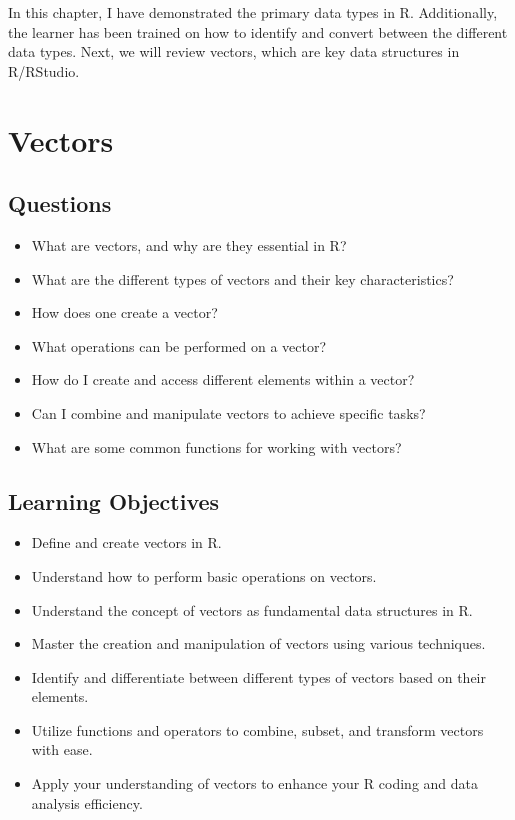 \documentclass[
  letterpaper,
  DIV=11,
  numbers=noendperiod]{scrreprt}
\begin{document}
In this chapter, I have demonstrated the primary data types in R.
Additionally, the learner has been trained on how to identify and
convert between the different data types. Next, we will review vectors,
which are key data structures in R/RStudio.


\chapter{Vectors}\label{sec-vectors}

\section{Questions}\label{questions-8}

\begin{itemize}
\item
  What are vectors, and why are they essential in R?
\item
  What are the different types of vectors and their key characteristics?
\item
  How does one create a vector?
\item
  What operations can be performed on a vector?
\item
  How do I create and access different elements within a vector?
\item
  Can I combine and manipulate vectors to achieve specific tasks?
\item
  What are some common functions for working with vectors?
\end{itemize}

\section{Learning Objectives}\label{learning-objectives-8}

\begin{itemize}
\item
  Define and create vectors in R.
\item
  Understand how to perform basic operations on vectors.
\item
  Understand the concept of vectors as fundamental data structures in R.
\item
  Master the creation and manipulation of vectors using various
  techniques.
\item
  Identify and differentiate between different types of vectors based on
  their elements.
\item
  Utilize functions and operators to combine, subset, and transform
  vectors with ease.
\item
  Apply your understanding of vectors to enhance your R coding and data
  analysis efficiency.
\end{itemize}
\end{document}
